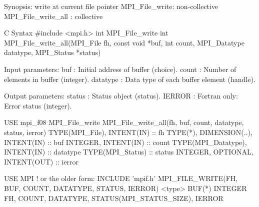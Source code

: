 Synopsis:
write at current file pointer
MPI_File_write: non-collective
MPI_File_write_all : collective

C Syntax
#include <mpi.h>
int MPI_File_write
int MPI_File_write_all(MPI_File fh, const void *buf,
    int count, MPI_Datatype datatype,
    MPI_Status *status)

Input parameters:
buf : Initial address of buffer (choice). 
count : Number of elements in buffer (integer). 
datatype : Data type of each buffer element (handle). 

Output parameters:
status : Status object (status). 
IERROR : Fortran only: Error status (integer). 

USE mpi_f08
MPI_File_write
MPI_File_write_all(fh, buf, count, datatype, status, ierror)
    TYPE(MPI_File), INTENT(IN) :: fh
    TYPE(*), DIMENSION(..), INTENT(IN) :: buf
    INTEGER, INTENT(IN) :: count
    TYPE(MPI_Datatype), INTENT(IN) :: datatype
    TYPE(MPI_Status) :: status
    INTEGER, OPTIONAL, INTENT(OUT) :: ierror

USE MPI
! or the older form: INCLUDE ’mpif.h’
MPI_FILE_WRITE(FH, BUF, COUNT,
    DATATYPE, STATUS, IERROR)
    <type>    BUF(*)
    INTEGER    FH, COUNT, DATATYPE, STATUS(MPI_STATUS_SIZE), IERROR

